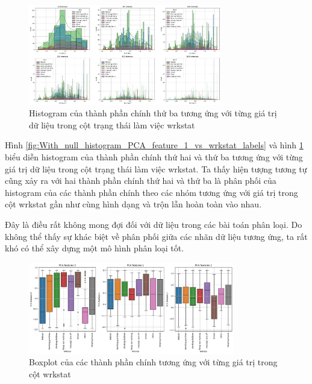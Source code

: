 \begin{figure}[H]
    \centering
    \includegraphics[width=0.75\textwidth]{figures/Thanh/Data_Analysis/With_null_histogram_PCA_feature_2_vs_wrkstat_labels.png}
    \caption{Histogram của thành phần chính thứ ba tương ứng với từng giá trị dữ liệu trong cột trạng thái làm việc wrkstat}
    \label{fig:With_null_histogram_PCA_feature_2_vs_wrkstat_labels}
\end{figure}


Hình \ref{fig:With_null_histogram_PCA_feature_1_vs_wrkstat_labels} và hình \ref{fig:With_null_histogram_PCA_feature_2_vs_wrkstat_labels} biểu diễn histogram của thành phần chính thứ hai và thứ ba tương ứng với từng giá trị dữ liệu trong cột trạng thái làm việc wrkstat.
Ta thấy hiện tượng tương tự cũng xảy ra với hai thành phần chính thứ hai và thứ ba là phân phối của histogram của các thành phần chính theo các nhóm tương ứng với giá trị trong cột wrkstat gần như cùng hình dạng và trộn lẫn hoàn toàn vào nhau.

Đây là điều rất không mong đợi đối với dữ liệu trong các bài toán phân loại.
Do không thể thấy sự khác biệt về phân phối giữa các nhãn dữ liệu tương ứng, ta rất khó có thể xây dựng một mô hình phân loại tốt.

\begin{figure}[H]
    \centering
    \includegraphics[width=0.8\textwidth]{figures/Thanh/Data_Analysis/With_null_boxplot_PCA_features_vs_wrkstat_labels.png}
    \caption{Boxplot của các thành phần chính tương ứng với từng giá trị trong cột wrkstat}
    \label{fig:With_null_boxplot_PCA_features_vs_wrkstat_labels}
\end{figure}

